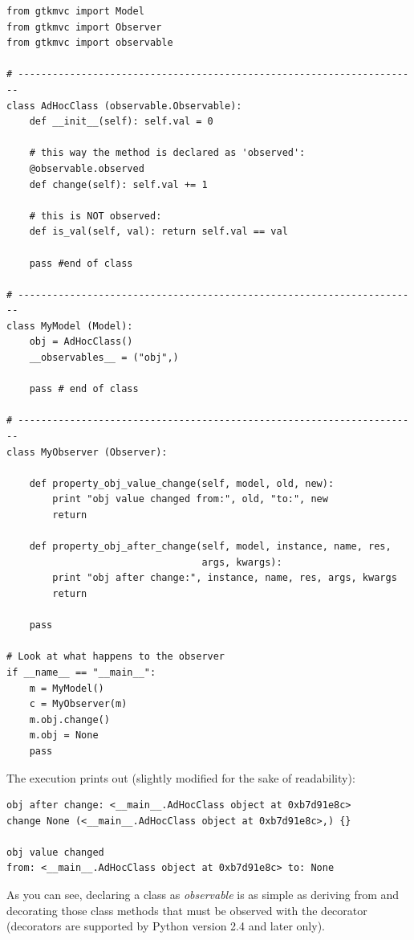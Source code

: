 { \codesize 
\begin{verbatim} 
from gtkmvc import Model
from gtkmvc import Observer
from gtkmvc import observable

# ----------------------------------------------------------------------
class AdHocClass (observable.Observable):
    def __init__(self): self.val = 0

    # this way the method is declared as 'observed':
    @observable.observed 
    def change(self): self.val += 1

    # this is NOT observed:
    def is_val(self, val): return self.val == val

    pass #end of class

# ----------------------------------------------------------------------
class MyModel (Model):
    obj = AdHocClass()
    __observables__ = ("obj",)

    pass # end of class

# ----------------------------------------------------------------------
class MyObserver (Observer):

    def property_obj_value_change(self, model, old, new):
        print "obj value changed from:", old, "to:", new 
        return

    def property_obj_after_change(self, model, instance, name, res,
                                  args, kwargs):
        print "obj after change:", instance, name, res, args, kwargs
        return

    pass

# Look at what happens to the observer
if __name__ == "__main__":
    m = MyModel()
    c = MyObserver(m)
    m.obj.change()
    m.obj = None
    pass
\end{verbatim}
}

The execution prints out (slightly modified for the sake of
readability):

{ \codesize 
\begin{verbatim} 
obj after change: <__main__.AdHocClass object at 0xb7d91e8c> 
change None (<__main__.AdHocClass object at 0xb7d91e8c>,) {}

obj value changed 
from: <__main__.AdHocClass object at 0xb7d91e8c> to: None
\end{verbatim}
}

As you can see, declaring a class as \emph{observable} is as simple as
deriving from  and decorating
those class methods that must be observed with the decorator 
 (decorators are supported by
Python version 2.4 and later only). 

